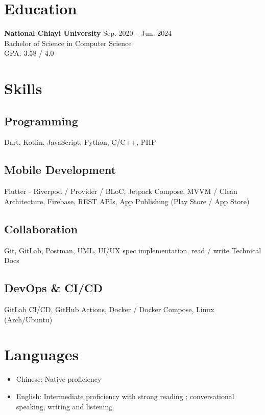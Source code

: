\documentclass[a4paper,10pt]{article}
\begin{document}
\section*{Education}
\textbf{National Chiayi University} \hfill Sep. 2020 -- Jun. 2024 \\
Bachelor of Science in Computer Science \\

GPA: 3.58 / 4.0

\section*{Skills}

\subsection*{Programming}
Dart, Kotlin, JavaScript, Python, C/C++, PHP

\subsection*{Mobile Development}
Flutter - Riverpod / Provider / BLoC, Jetpack Compose, MVVM / Clean Architecture, Firebase, REST APIs, App Publishing (Play Store / App Store)

\subsection*{Collaboration}
Git, GitLab, Postman, UML, UI/UX spec implementation, read / write Technical Docs

\subsection*{DevOps \& CI/CD}
GitLab CI/CD, GitHub Actions, Docker / Docker Compose, Linux (Arch/Ubuntu)

\section*{Languages}
\begin{itemize}[left=0pt, label={--}]
    \item Chinese: Native proficiency
    \item English: Intermediate proficiency with strong reading ; conversational speaking, writing and listening
\end{itemize}
\end{document}
